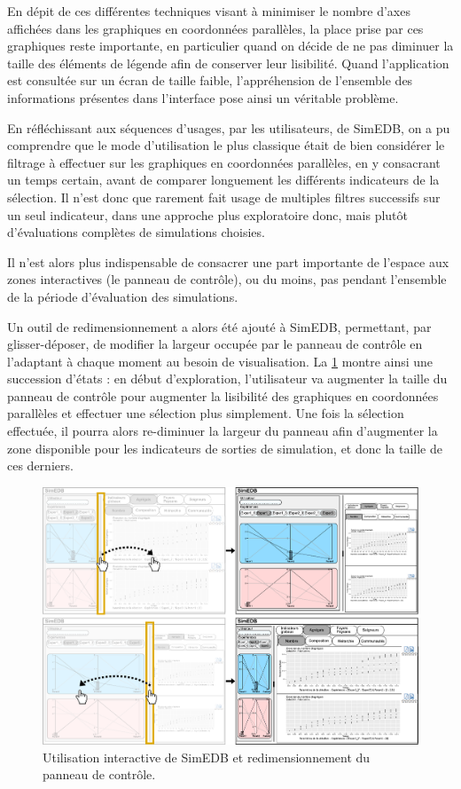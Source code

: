 En dépit de ces différentes techniques visant à minimiser le nombre d'axes affichées dans les graphiques en coordonnées parallèles, la place prise par ces graphiques reste importante, en particulier quand on décide de ne pas diminuer la taille des éléments de légende afin de conserver leur lisibilité.
Quand l'application est consultée sur un écran de taille faible, l'appréhension de l'ensemble des informations présentes dans l'interface pose ainsi un véritable problème.

En réfléchissant aux séquences d'usages, par les utilisateurs, de SimEDB, on a pu comprendre que le mode d'utilisation le plus classique était de bien considérer le filtrage à effectuer sur les graphiques en coordonnées parallèles, en y consacrant un temps certain, avant de comparer longuement les différents indicateurs de la sélection.
Il n'est donc que rarement fait usage de multiples filtres successifs sur un seul indicateur, dans une approche plus exploratoire donc, mais plutôt d'évaluations complètes de simulations choisies.

Il n'est alors plus indispensable de consacrer une part importante de l'espace aux zones interactives (le panneau de contrôle), ou du moins, pas pendant l'ensemble de la période d'évaluation des simulations.

Un outil de redimensionnement a alors été ajouté à SimEDB, permettant, par glisser-déposer, de modifier la largeur occupée par le panneau de contrôle en l'adaptant à chaque moment au besoin de visualisation.
La \cref{fig:resizing} montre ainsi une succession d'états : en début d'exploration, l'utilisateur va augmenter la taille du panneau de contrôle pour augmenter la lisibilité des graphiques en coordonnées parallèles et effectuer une sélection plus simplement.
Une fois la sélection effectuée, il pourra alors re-diminuer la largeur du panneau afin d'augmenter la zone disponible pour les indicateurs de sorties de simulation, et donc la taille de ces derniers. 

\begin{figure}[H]
	\centering
	\includegraphics[width=\linewidth]{img/mockup_SimEDB_resize.pdf}
	\caption{Utilisation interactive de SimEDB et redimensionnement du panneau de contrôle.}
	\label{fig:resizing}
\end{figure}

